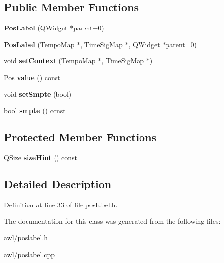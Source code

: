 \subsection*{Public Member Functions}
\begin{DoxyCompactItemize}
\item 
\mbox{\label{class_awl_1_1_pos_label_a5e442068421820c20e9556c290af8058}} 
{\bfseries Pos\+Label} (Q\+Widget $\ast$parent=0)
\item 
\mbox{\label{class_awl_1_1_pos_label_a99f094430f49e5d4cce7b7dbb7742985}} 
{\bfseries Pos\+Label} (\hyperlink{class_ms_1_1_tempo_map}{Tempo\+Map} $\ast$, \hyperlink{class_ms_1_1_time_sig_map}{Time\+Sig\+Map} $\ast$, Q\+Widget $\ast$parent=0)
\item 
\mbox{\label{class_awl_1_1_pos_label_a66fd785d04dfb3d1a2c96ad31b431be7}} 
void {\bfseries set\+Context} (\hyperlink{class_ms_1_1_tempo_map}{Tempo\+Map} $\ast$, \hyperlink{class_ms_1_1_time_sig_map}{Time\+Sig\+Map} $\ast$)
\item 
\mbox{\label{class_awl_1_1_pos_label_a284cee7dee5d0aaf76cbbfbe13bf9010}} 
\hyperlink{class_ms_1_1_pos}{Pos} {\bfseries value} () const
\item 
\mbox{\label{class_awl_1_1_pos_label_a4ced22c68e2774fecadc83215dd176ee}} 
void {\bfseries set\+Smpte} (bool)
\item 
\mbox{\label{class_awl_1_1_pos_label_a1a15d7e126280aa22c4eb9d68a5f9979}} 
bool {\bfseries smpte} () const
\end{DoxyCompactItemize}
\subsection*{Protected Member Functions}
\begin{DoxyCompactItemize}
\item 
\mbox{\label{class_awl_1_1_pos_label_afb106608178a55255c8b34c663147f9a}} 
Q\+Size {\bfseries size\+Hint} () const
\end{DoxyCompactItemize}


\subsection{Detailed Description}


Definition at line 33 of file poslabel.\+h.



The documentation for this class was generated from the following files\+:\begin{DoxyCompactItemize}
\item 
awl/poslabel.\+h\item 
awl/poslabel.\+cpp\end{DoxyCompactItemize}
